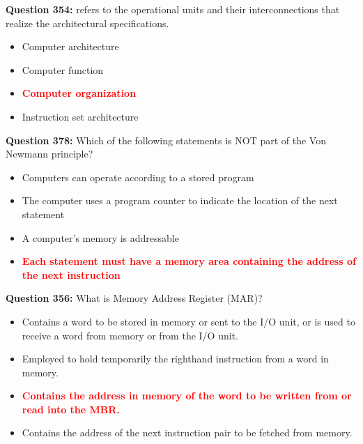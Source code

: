 \documentclass[12pt,a4paper]{article}
\begin{document}
\vspace{0.5cm}

\vspace{0.5cm}

\textbf{Question 354:} \underline{\hspace{1.5cm}} refers to the operational units and their interconnections that realize the architectural specifications.

\begin{itemize}
    \item[\textbf{A.}] Computer architecture
    \item[\textbf{B.}] Computer function
    \item[\textbf{C.}] \textcolor{red}{\textbf{Computer organization}}
    \item[\textbf{D.}] Instruction set architecture
\end{itemize}

\vspace{0.5cm}

\vspace{0.5cm}

\textbf{Question 378:} Which of the following statements is NOT part of the Von Newmann principle?

\begin{itemize}
    \item[\textbf{A.}] Computers can operate according to a stored program
    \item[\textbf{B.}] The computer uses a program counter to indicate the location of the next statement
    \item[\textbf{C.}] A computer's memory is addressable
    \item[\textbf{D.}] \textcolor{red}{\textbf{Each statement must have a memory area containing the address of the next instruction}}
\end{itemize}

\vspace{0.5cm}

\vspace{0.5cm}

\textbf{Question 356:} What is Memory Address Register (MAR)?

\begin{itemize}
    \item[\textbf{A.}] Contains a word to be stored in memory or sent to the I/O unit, or is used to receive a word from memory or from the I/O unit.
    \item[\textbf{B.}] Employed to hold temporarily the righthand instruction from a word in memory.
    \item[\textbf{C.}] \textcolor{red}{\textbf{Contains the address in memory of the word to be written from or read into the MBR.}}
    \item[\textbf{D.}] Contains the address of the next instruction pair to be fetched from memory.
\end{itemize}
\end{document}
